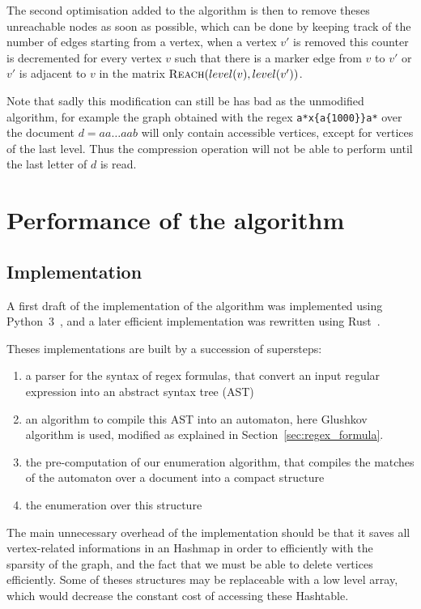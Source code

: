 \documentclass[12px]{article}
\theoremstyle{definition}
\begin{document}
        The second optimisation added to the algorithm is then to remove theses
        unreachable nodes as soon as possible, which can be done by keeping
        track of the number of edges starting from a vertex, when a vertex $v'$
        is removed this counter is decremented for every vertex $v$ such that
        there is a marker edge from $v$ to $v'$ or $v'$ is adjacent to $v$ in
        the matrix $\Call{Reach}{level(v), level(v')}$.

        Note that sadly this modification can still be has bad as the
        unmodified algorithm, for example the graph obtained with the regex
        \texttt{a*x\{a\{1000\}\}a*} over the document $d = aa \ldots aab$ will
        only contain accessible vertices, except for vertices of the last
        level.  Thus the compression operation will not be able to perform
        until the last letter of $d$ is read.

  \section{Performance of the algorithm}

    \subsection{Implementation}

      A first draft of the implementation of the algorithm was implemented
      using Python~3~\cite{implPython}, and a later efficient implementation
      was rewritten using Rust~\cite{implRust}.

      Theses implementations are built by a succession of supersteps:
      \begin{enumerate}
        \item a parser for the syntax of regex formulas, that convert an input
          regular expression into an abstract syntax tree (AST)
        \item an algorithm to compile this AST into an automaton, here
          Glushkov algorithm is used, modified as explained in
          Section~\ref{sec:regex_formula}.
        \item the pre-computation of our enumeration algorithm, that compiles
          the matches of the automaton over a document into a compact structure
        \item the enumeration over this structure
      \end{enumerate}

      The main unnecessary overhead of the implementation should be that it
      saves all vertex-related informations in an Hashmap in order to
      efficiently with the sparsity of the graph, and the fact that we must be
      able to delete vertices efficiently. Some of theses structures may be
      replaceable with a low level array, which would decrease the constant
      cost of accessing these Hashtable.
\end{document}
